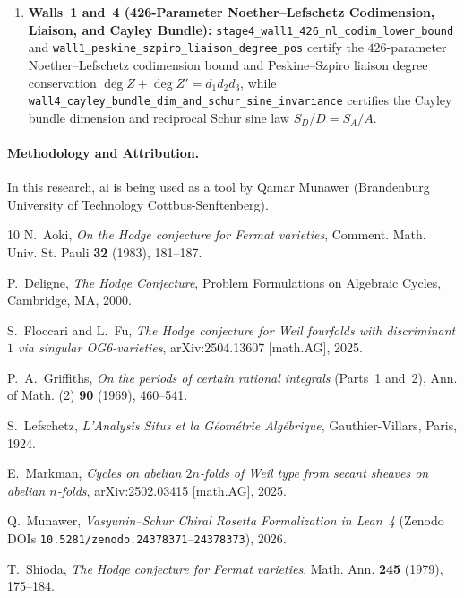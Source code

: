 \documentclass[11pt,a4paper]{article}
\begin{document}
\begin{enumerate}
\item \textbf{Walls~1 and~4 (426-Parameter Noether--Lefschetz Codimension, Liaison, and Cayley Bundle):} \texttt{stage4\_wall1\_426\_nl\_codim\_lower\_bound} and \texttt{wall1\_peskine\_szpiro\_liaison\_degree\_pos} certify the $426$-parameter Noether--Lefschetz codimension bound and Peskine--Szpiro liaison degree conservation $\deg Z + \deg Z' = d_1 d_2 d_3$, while \texttt{wall4\_cayley\_bundle\_dim\_and\_schur\_sine\_invariance} certifies the Cayley bundle dimension and reciprocal Schur sine law $S_D / D = S_A / A$.
\end{enumerate}

\paragraph*{Methodology and Attribution.}
In this research, ai is being used as a tool by Qamar Munawer (Brandenburg University of Technology Cottbus-Senftenberg).

\begin{thebibliography}{10}
N.~Aoki, \emph{On the Hodge conjecture for Fermat varieties}, Comment. Math. Univ. St. Pauli \textbf{32} (1983), 181--187.

P.~Deligne, \emph{The Hodge Conjecture}, Problem Formulations on Algebraic Cycles, Cambridge, MA, 2000.

S.~Floccari and L.~Fu, \emph{The Hodge conjecture for Weil fourfolds with discriminant $1$ via singular OG6-varieties}, arXiv:2504.13607 [math.AG], 2025.

P.~A.~Griffiths, \emph{On the periods of certain rational integrals} (Parts~1 and~2), Ann. of Math. (2) \textbf{90} (1969), 460--541.

S.~Lefschetz, \emph{L'Analysis Situs et la G\'eom\'etrie Alg\'ebrique}, Gauthier-Villars, Paris, 1924.

E.~Markman, \emph{Cycles on abelian $2n$-folds of Weil type from secant sheaves on abelian $n$-folds}, arXiv:2502.03415 [math.AG], 2025.

Q.~Munawer, \emph{Vasyunin--Schur Chiral Rosetta Formalization in Lean~4} (Zenodo DOIs \texttt{10.5281/zenodo.24378371}--\texttt{24378373}), 2026.

T.~Shioda, \emph{The Hodge conjecture for Fermat varieties}, Math. Ann. \textbf{245} (1979), 175--184.
\end{thebibliography}
\end{document}
